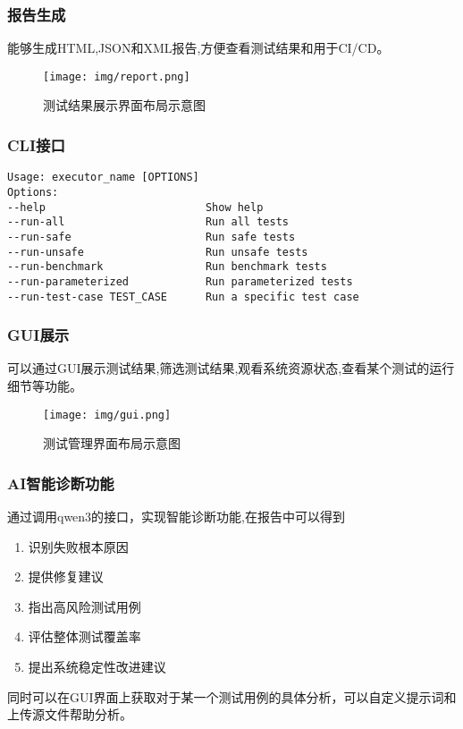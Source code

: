 \documentclass{article}
\begin{document}
\subsubsection{报告生成}
能够生成HTML,JSON和XML报告,方便查看测试结果和用于CI/CD。
\begin{figure}[H]
    \centering
    \texttt{[image: img/report.png]}
    \caption{测试结果展示界面布局示意图}
    \label{fig:report}
    \small
\end{figure}
\subsubsection{CLI接口}
\begin{framed}
    \begin{lstlisting}
Usage: executor_name [OPTIONS] 
Options: 
--help                         Show help 
--run-all                      Run all tests
--run-safe                     Run safe tests
--run-unsafe                   Run unsafe tests
--run-benchmark                Run benchmark tests
--run-parameterized            Run parameterized tests
--run-test-case TEST_CASE      Run a specific test case
\end{lstlisting}
\end{framed}

\subsubsection{GUI展示}
可以通过GUI展示测试结果,筛选测试结果,观看系统资源状态,查看某个测试的运行细节等功能。
\begin{figure}[H]
    \centering
    \texttt{[image: img/gui.png]}
    \caption{测试管理界面布局示意图}
    \label{fig:gui}
    \small
\end{figure}
\subsubsection{AI智能诊断功能}
通过调用qwen3的接口，实现智能诊断功能,在报告中可以得到
\begin{enumerate}
    \item 识别失败根本原因
    \item 提供修复建议
    \item 指出高风险测试用例
    \item 评估整体测试覆盖率
    \item 提出系统稳定性改进建议
\end{enumerate}

同时可以在GUI界面上获取对于某一个测试用例的具体分析，可以自定义提示词和上传源文件帮助分析。
\newpage
\end{document}

